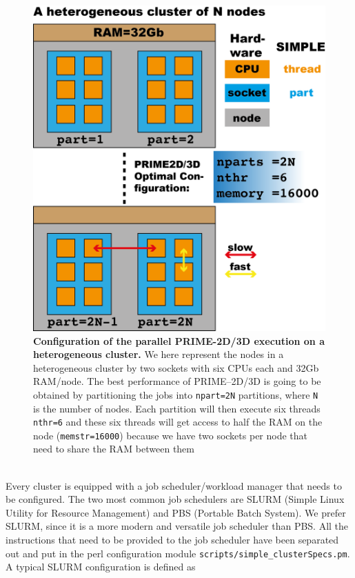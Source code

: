\documentclass[a4paper,11pt]{article}
\begin{document}
\begin{figure}
\includegraphics[keepaspectratio=true,scale=0.6]{./CPUtopo/cputopo}
\caption{\textbf{Configuration of the parallel PRIME-2D/3D execution on a heterogeneous cluster.} We here represent the nodes in  a heterogeneous cluster by two sockets with six CPUs each and 32Gb RAM/node. The best performance of PRIME--2D/3D is going to be obtained by partitioning  the jobs into \texttt{npart=2N} partitions, where \texttt{N} is the number of nodes. Each partition will then execute six threads \texttt{nthr=6} and these six threads will get access to half the RAM on the node (\texttt{memstr=16000}) because we have two sockets per node that need to share the RAM between them}
\end{figure}
\\Every cluster is equipped with a job scheduler/workload manager that needs to be configured. The two most common job schedulers are SLURM (Simple Linux Utility for Resource Management) and PBS (Portable Batch System). We prefer SLURM, since it is a more modern and versatile job scheduler than PBS. All the instructions that need to be provided to the job scheduler have been separated out and put in the perl configuration module \texttt{scripts/simple\_clusterSpecs.pm}. A typical SLURM configuration is defined as
\end{document}
